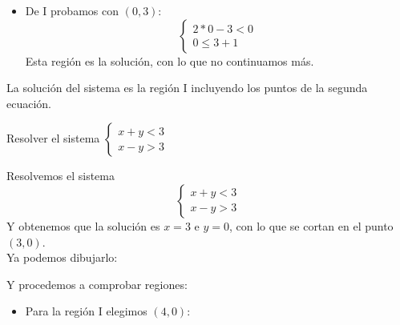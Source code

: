 \documentclass[a4paper,11pt,answers]{exam}
\begin{document}
\begin{questions}
\begin{solution}
\begin{enumerate}
      \begin{itemize}
      \item De I probamos con $(0, 3)$:
        \[
          \begin{cases}
            2*0 - 3 < 0\\
            0 \leq 3 + 1
          \end{cases}
        \]
        Esta región es la solución, con lo que no continuamos más.
      \end{itemize}
      La solución del sistema es la región I incluyendo los puntos de la segunda ecuación.
    \end{enumerate}
  \end{solution}
\question Resolver el sistema $
  \begin{cases}
    x+y < 3\\
    x-y > 3
  \end{cases}
  $
  \begin{solution}
    Resolvemos el sistema
    \[
      \begin{cases}
        x+y < 3\\
        x-y > 3
      \end{cases}
    \]
    Y obtenemos que la solución es $x = 3$ e $y = 0$, con lo que se cortan en el punto $(3, 0)$.\\
    Ya podemos dibujarlo:
    \begin{center}
    \end{center}
    Y procedemos a comprobar regiones:
    \begin{itemize}
    \item Para la región I elegimos $(4, 0)$:

\end{itemize}
\end{solution}
\end{questions}
\end{document}
